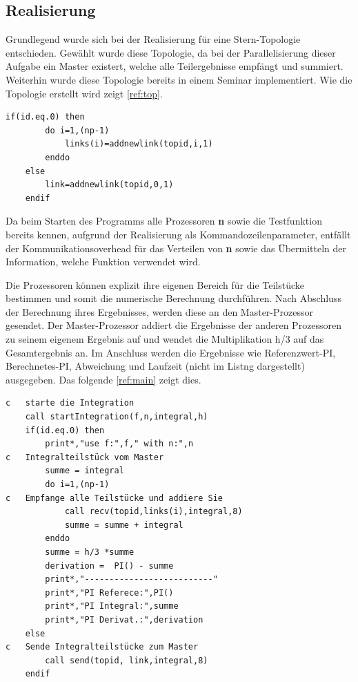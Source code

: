 \subsection{Realisierung}

Grundlegend wurde sich bei der Realisierung für eine Stern-Topologie entschieden.
Gewählt wurde diese Topologie, da bei der Parallelisierung dieser Aufgabe ein Master existert, welche alle Teilergebnisse empfängt und summiert.
Weiterhin wurde diese Topologie bereits in einem Seminar implementiert.
Wie die Topologie erstellt wird zeigt \autoref{ref:top}.

\begin{lstlisting}[caption=Erzeugen der Stern-Topologie\label{ref:top}]
	if(id.eq.0) then
		do i=1,(np-1)
			links(i)=addnewlink(topid,i,1)
		enddo
	else
		link=addnewlink(topid,0,1)
	endif
\end{lstlisting}

Da beim Starten des Programms alle Prozessoren \textbf{n} sowie die Testfunktion bereits kennen, aufgrund der Realisierung als Kommandozeilenparameter, entfällt der Kommunikationsoverhead für das Verteilen von \textbf{n} sowie das Übermitteln der Information, welche Funktion verwendet wird.

Die Prozessoren können explizit ihre eigenen Bereich für die Teilstücke bestimmen und somit die numerische Berechnung durchführen.
Nach Abschluss der Berechnung ihres Ergebnisses, werden diese an den Master-Prozessor gesendet.
Der Master-Prozessor addiert die Ergebnisse der anderen Prozessoren zu seinem eigenem Ergebnis auf und wendet die Multiplikation h/3 auf das Gesamtergebnis an.
Im Anschluss werden die Ergebnisse wie Referenzwert-PI, Berechnetes-PI, Abweichung und Laufzeit (nicht im Listng dargestellt) ausgegeben. 
Das folgende \autoref{ref:main} zeigt dies.

\begin{lstlisting}[caption=Empfangen und Auswerten\label{ref:main}]
c	starte die Integration
	call startIntegration(f,n,integral,h)
	if(id.eq.0) then
		print*,"use f:",f," with n:",n
c  	Integralteilstück vom Master
		summe = integral
		do i=1,(np-1)
c 	Empfange alle Teilstücke und addiere Sie
			call recv(topid,links(i),integral,8)
			summe = summe + integral
		enddo
		summe = h/3 *summe
		derivation =  PI() - summe
		print*,"--------------------------"
		print*,"PI Referece:",PI()                   
		print*,"PI Integral:",summe
		print*,"PI Derivat.:",derivation
	else
c	Sende Integralteilstücke zum Master
		call send(topid, link,integral,8)
	endif
\end{lstlisting}

